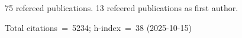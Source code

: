 75 refereed publications. 13 refeered publications as first author.

Total citations~=~5234; h-index~=~38 (2025-10-15)